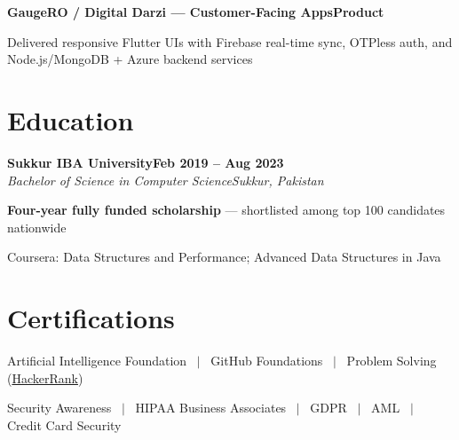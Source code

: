 \documentclass[letterpaper,10pt]{article}
\newcommand{\heading}[2]{
  \hspace{8pt}#1\hfill#2\\
}
\newcommand{\headingBf}[2]{
  \heading{\textbf{#1}}{\textbf{#2}}
}
\newcommand{\headingIt}[2]{
  \heading{\textit{#1}}{\textit{#2}}
}
\newenvironment{resume_list}{
  \vspace{-6pt}
  \begin{itemize}[itemsep=-1px, parsep=0.5pt, topsep=1pt, leftmargin=22pt]
}{
  \end{itemize}
  \vspace{-2pt}
}
\begin{document}
\vspace{2pt}
\headingBf{GaugeRO / Digital Darzi --- Customer-Facing Apps}{Product}
\begin{resume_list}
  \item Delivered responsive Flutter UIs with Firebase real-time sync, OTPless auth, and Node.js/MongoDB + Azure backend services
\end{resume_list}

\section{Education}
\headingBf{Sukkur IBA University}{Feb 2019 -- Aug 2023}
\headingIt{Bachelor of Science in Computer Science}{Sukkur, Pakistan}
\begin{resume_list}
  \item \textbf{Four-year fully funded scholarship} --- shortlisted among top 100 candidates nationwide
  \item Coursera: Data Structures and Performance; Advanced Data Structures in Java
\end{resume_list}

\section{Certifications}
\begin{resume_list}
  \item Artificial Intelligence Foundation ~$|$~ GitHub Foundations ~$|$~ Problem Solving (\href{https://www.hackerrank.com/profile/sooraj_bcss19}{HackerRank})
  \item Security Awareness ~$|$~ HIPAA Business Associates ~$|$~ GDPR ~$|$~ AML ~$|$~ Credit Card Security
\end{resume_list}
\end{document}
